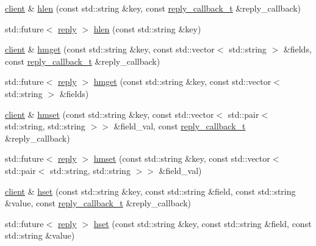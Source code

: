 \begin{DoxyCompactItemize}
\item 
\hyperlink{classcpp__redis_1_1client}{client} \& \hyperlink{classcpp__redis_1_1client_a88b88d74f77f2a59bc75b7d1fcdbd483}{hlen} (const std\+::string \&key, const \hyperlink{classcpp__redis_1_1client_a061a1140d36d2eaeda82b09a0bb3f9f2}{reply\+\_\+callback\+\_\+t} \&reply\+\_\+callback)
\item 
std\+::future$<$ \hyperlink{classcpp__redis_1_1reply}{reply} $>$ \hyperlink{classcpp__redis_1_1client_a34b5783e7392f29dd26c6e114d535221}{hlen} (const std\+::string \&key)
\item 
\hyperlink{classcpp__redis_1_1client}{client} \& \hyperlink{classcpp__redis_1_1client_aac28715b6b151dd96ddb760fcc490c3c}{hmget} (const std\+::string \&key, const std\+::vector$<$ std\+::string $>$ \&fields, const \hyperlink{classcpp__redis_1_1client_a061a1140d36d2eaeda82b09a0bb3f9f2}{reply\+\_\+callback\+\_\+t} \&reply\+\_\+callback)
\item 
std\+::future$<$ \hyperlink{classcpp__redis_1_1reply}{reply} $>$ \hyperlink{classcpp__redis_1_1client_a8e3af68988204e491ada35efaaf9b247}{hmget} (const std\+::string \&key, const std\+::vector$<$ std\+::string $>$ \&fields)
\item 
\hyperlink{classcpp__redis_1_1client}{client} \& \hyperlink{classcpp__redis_1_1client_a8c5f96c6e663d89aa18baba495872cfb}{hmset} (const std\+::string \&key, const std\+::vector$<$ std\+::pair$<$ std\+::string, std\+::string $>$$>$ \&field\+\_\+val, const \hyperlink{classcpp__redis_1_1client_a061a1140d36d2eaeda82b09a0bb3f9f2}{reply\+\_\+callback\+\_\+t} \&reply\+\_\+callback)
\item 
std\+::future$<$ \hyperlink{classcpp__redis_1_1reply}{reply} $>$ \hyperlink{classcpp__redis_1_1client_acbb8d8fa40a64a155e19e49aae12f117}{hmset} (const std\+::string \&key, const std\+::vector$<$ std\+::pair$<$ std\+::string, std\+::string $>$$>$ \&field\+\_\+val)
\item 
\hyperlink{classcpp__redis_1_1client}{client} \& \hyperlink{classcpp__redis_1_1client_a3d5367719dc31fb3dfa49202d1e7f9ad}{hset} (const std\+::string \&key, const std\+::string \&field, const std\+::string \&value, const \hyperlink{classcpp__redis_1_1client_a061a1140d36d2eaeda82b09a0bb3f9f2}{reply\+\_\+callback\+\_\+t} \&reply\+\_\+callback)
\item 
std\+::future$<$ \hyperlink{classcpp__redis_1_1reply}{reply} $>$ \hyperlink{classcpp__redis_1_1client_ae212c8371dbd9ceff386f789226eb173}{hset} (const std\+::string \&key, const std\+::string \&field, const std\+::string \&value)

\end{DoxyCompactItemize}

